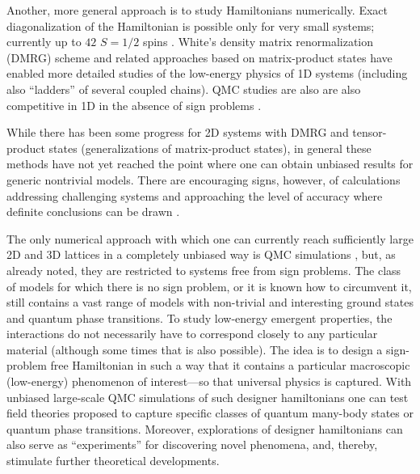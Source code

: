 \documentclass[range]{ar2e}
\begin{document}
Another, more general approach is to study Hamiltonians numerically. Exact diagonalization of the Hamiltonian is possible 
only for very small systems; currently up to $42$ $S=1/2$ spins \cite{Nakano11,Lauchli11}. White's density matrix 
renormalization (DMRG) scheme \cite{White92} and related approaches based on matrix-product states \cite{Schollwock05} 
have enabled more detailed studies of the low-energy physics of 1D systems (including also ``ladders'' of several 
coupled chains). QMC studies are also are also competitive in 1D in the absence of sign problems \cite{Sandvik04,Jeckelmann02,Mund09}.

While there has been some progress for 2D systems with DMRG \cite{Stoudenmire12} and tensor-product \cite{Murg09,Gu08,Xie09} states (generalizations 
of matrix-product states), in general these methods have not yet reached the point where one can obtain unbiased results for generic 
nontrivial models. There are encouraging signs, however, of calculations addressing challenging systems and approaching the level of accuracy 
where definite conclusions can be drawn \cite{Bauer12}.

The only numerical approach with which one can currently reach sufficiently large 2D and 3D lattices in a completely unbiased way is QMC 
simulations \cite{Evertz03,Sandvik10b}, but, as already noted, they are restricted to systems free from sign problems. The class of models 
for which there is no sign problem, or it is known how to circumvent it, still contains a vast range of models with non-trivial 
and interesting ground states and quantum phase transitions. To study low-energy emergent 
properties, the interactions do not necessarily have to correspond closely to any particular material (although some 
times that is also possible). The idea is to design a sign-problem free Hamiltonian in such a way that it contains a 
particular macroscopic (low-energy) phenomenon of interest---so that universal physics is captured. With unbiased large-scale 
QMC simulations of such designer hamiltonians one can test field theories proposed to capture specific classes of quantum many-body 
states or quantum phase transitions. Moreover, explorations of designer hamiltonians can also serve as ``experiments'' for 
discovering novel phenomena, and, thereby, stimulate further theoretical developments.
\end{document}
